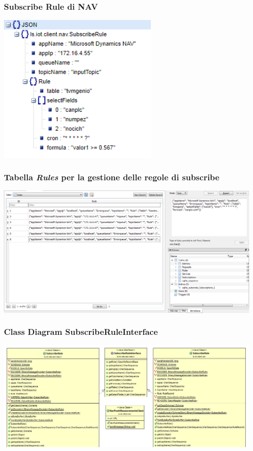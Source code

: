 \documentclass{beamer}
\begin{document}
\begin{frame}
\frametitle{Subscribe Rule di NAV}
\includegraphics[width=0.6\textwidth]{images/subscribe-json-2.png}
\end{frame}

\begin{frame}
\frametitle{Tabella \textit{Rules} per la gestione delle regole di subscribe}
\includegraphics[width=1\textwidth]{images/DBPlatform1.png}
\end{frame}

\begin{frame}
\frametitle{Class Diagram SubscribeRuleInterface}
\includegraphics[width=1\textwidth]{images/figura10.png}
\end{frame}
\end{document}

